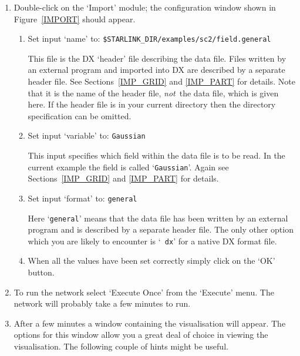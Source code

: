 \documentclass[twoside,11pt]{article}
\begin{document}
\begin{enumerate}

  \item Double-click on the `Import' module; the configuration window
   shown in Figure~\ref{IMPORT} should appear.

  \begin{enumerate}

    \item Set input `name' to: {\tt \$STARLINK\_DIR/examples/sc2/field.general}

     This file is the DX `header' file describing the data file.
     Files written by an external program and imported into DX are
     described by a separate header file. See Sections~\ref{IMP_GRID}
     and \ref{IMP_PART} for details. Note that it is the name of the
     header file, {\it not}\, the data file, which is given here. If
     the header file is in your current directory then the directory
     specification can be omitted.

    \item Set input `variable' to: {\tt Gaussian}

     This input specifies which field within the data file is to be
     read. In the current example the field is called `{\tt Gaussian}'.
     Again see Sections~\ref{IMP_GRID} and \ref{IMP_PART} for details.

    \item Set input `format' to: {\tt general}

     Here `{\tt general}' means that the data file has been written by
     an external program and is described by a separate header file.
     The only other option which you are likely to encounter is `{\tt
     dx}' for a native DX format file.

    \item When all the values have been set correctly simply click on
     the `OK' button.

  \end{enumerate}

  \item To run the network select `Execute Once' from the `Execute'
   menu.  The network will probably take a few minutes to run.

  \item After a few minutes a window containing the visualisation will
   appear. The options for this window allow you a great deal of choice
   in viewing the visualisation. The following couple of hints might be
   useful.


\end{enumerate}
\end{document}
